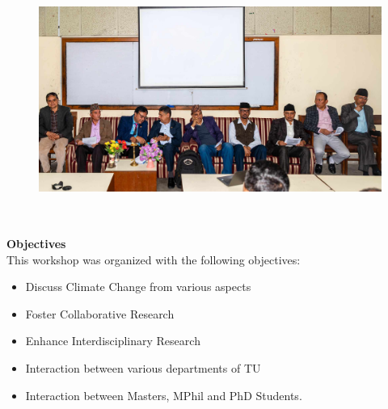 \documentclass[a4paper,12pt]{report}
\begin{document}
\vspace{5mm}
\begin{figure}[hb!]
  \centering
  \includegraphics[width=15cm, height=8cm]{guest.jpg}
\end{figure}
\clearpage

{\Large \textbf{Objectives}}\\

This workshop was organized with the following objectives:
\begin{itemize}
\item Discuss Climate Change from various aspects
\item Foster Collaborative Research
\item Enhance Interdisciplinary Research
\item Interaction between various departments of TU
\item Interaction between Masters, MPhil and PhD Students.
\end{itemize}

\vspace{15mm}
\end{document}
